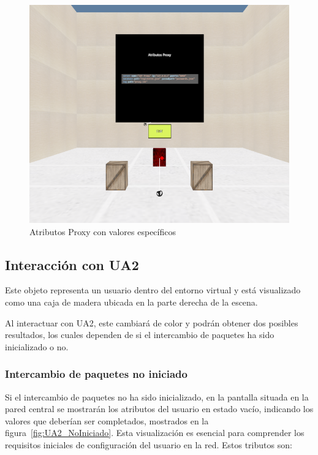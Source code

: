\documentclass[a4paper, 12pt]{book}
\begin{document}
\begin{figure}
  \centering
  \includegraphics[width=15cm, keepaspectratio]{img/resultados/Proxy_Iniciado.png}
  \caption{Atributos Proxy con valores específicos}
  \label{fig:Proxy_Iniciado}
\end{figure}


\subsection{Interacción con UA2}
\label{subsec:objeto_ua1}

Este objeto representa un usuario dentro del entorno virtual y está visualizado como una caja 
de madera ubicada en la parte derecha de la escena.

Al interactuar con UA2, este cambiará de color y podrán obtener dos posibles resultados, los cuales dependen 
de si el intercambio de paquetes ha sido inicializado o no.

\subsubsection{Intercambio de paquetes no iniciado}
\label{subsubsec:Intercambio_NoIniciado}
Si el intercambio de paquetes no ha sido inicializado, en la pantalla situada en la pared central se mostrarán 
los atributos del usuario en estado vacío, indicando los valores que deberían ser completados, mostrados en la figura~\ref{fig:UA2_NoIniciado}. 
Esta visualización es esencial para comprender los requisitos iniciales de configuración del usuario en la red. Estos tributos son:
\end{document}
